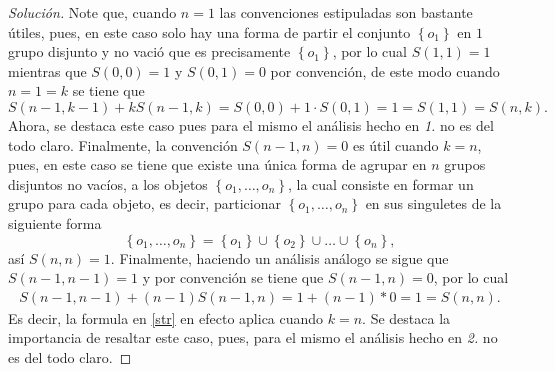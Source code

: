 \documentclass[10.5pt,notitlepage]{article}
\renewcommand{\qedsymbol}{$\blacksquare$}
\newenvironment{solucion}
  {\begin{proof}[Solución]}
  {\end{proof}}
\newcommand{\kis}[1]{\left\{ #1 \right\}}
\theoremstyle{plain}
\newenvironment{rem}
  {\pushQED{\qed}\renewcommand{\qedsymbol}{$\triangle$}\remarkex}
  {\popQED\endremarkex}
\begin{document}
\begin{solucion}
 \begin{rem}
 Note que, cuando \(n = 1\) las convenciones estipuladas son bastante útiles, pues, en este caso solo hay una forma de partir el conjunto \(\kis{o_1}\) en \(1\) grupo disjunto y no vació que es precisamente \(\kis{o_1}\), por lo cual \(S(1,1) = 1\) mientras que \(S(0,0) = 1\) y \(S(0,1) = 0\) por convención, de este modo cuando \(n = 1 = k\) se tiene que 
 \[
 S(n-1,k-1) + kS(n-1,k)=S(0,0)+1\cdot S(0,1)=1=S(1,1)=S(n,k).
 \]
 Ahora, se destaca este caso pues para el mismo el análisis hecho en \textit{1.} no es del todo claro. Finalmente, la convención \(S(n-1, n) = 0\) es útil cuando \(k = n\), pues, en este caso se tiene que existe una única forma de agrupar en \(n\) grupos disjuntos no vacíos, a los objetos \(\kis{o_1, \hdots, o_n}\), la cual consiste en formar un grupo para cada objeto, es decir, particionar \(\kis{o_1, \hdots, o_n}\) en sus singuletes de la siguiente forma
 \[
 \kis{o_1, \hdots, o_n} = \kis{o_1}\cup\kis{o_2}\cup \hdots \cup \kis{o_n},
 \]
 así \(S(n,n) = 1\). Finalmente, haciendo un análisis análogo se sigue que \(S(n-1,n-1) = 1\) y por convención se tiene que \(S(n-1,n) = 0\), por lo cual 
 \begin{align*}
     S(n-1,n-1) + (n-1)S(n-1,n) = 1 + (n-1)*0 = 1 =S(n,n).
 \end{align*}
 Es decir, la formula en \eqref{str} en efecto aplica cuando \(k = n\). Se destaca la importancia de resaltar este caso, pues, para el mismo el análisis hecho en \textit{2.} no es del todo claro. 
 \end{rem}
\end{solucion}
\end{document}
